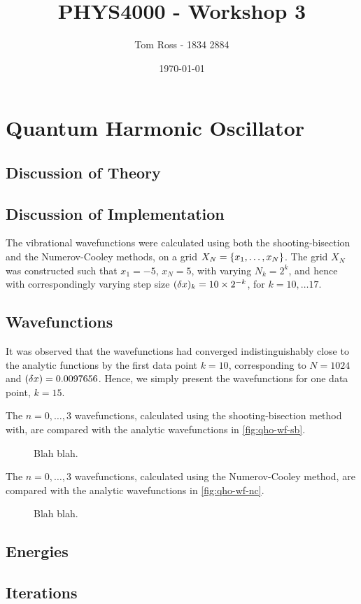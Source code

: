 \documentclass{article}
\title{PHYS4000 - Workshop 3}
\author{Tom Ross - 1834 2884}
\date{\today}
\begin{document}
\tableofcontents

\listoffigures

\listoftables

\clearpage

\section{Quantum Harmonic Oscillator}
\label{sec:qho}

\subsection*{Discussion of Theory}
\label{sec:qho-theory}

\subsection*{Discussion of Implementation}
\label{sec:qho-implementation}

The vibrational wavefunctions were calculated using both the shooting-bisection
and the Numerov-Cooley methods, on a grid
$X_{N} = \lbrace x_{1}, \dotsc, x_{N}\rbrace$.
The grid $X_{N}$ was constructed such that $x_{1} = -5$, $x_{N} = 5$, with
varying $N_{k} = 2^{k}$, and hence with correspondingly varying step size
$(\delta x)_{k} = 10 \times 2^{-k}$, for $k = 10, \dotsc 17$.

\subsection*{Wavefunctions}
\label{sec:qho-wavefunctions}

It was observed that the wavefunctions had converged indistinguishably close to
the analytic functions by the first data point $k = 10$, corresponding to
$N = 1024$ and $(\delta x) = 0.0097656$.
Hence, we simply present the wavefunctions for one data point, $k = 15$.

The $n = 0, \dotsc, 3$ wavefunctions, calculated using the shooting-bisection
method with, are compared with the analytic wavefunctions in
\autoref{fig:qho-wf-sb}.

\begin{figure}[h]
  \begin{center}
    
  \end{center}
  \caption[Bleh]{
    Blah blah.
  }
  \label{fig:qho-wf-sb}
\end{figure}

The $n = 0, \dotsc, 3$ wavefunctions, calculated using the Numerov-Cooley
method, are compared with the analytic wavefunctions in \autoref{fig:qho-wf-nc}.

\begin{figure}[h]
  \begin{center}
    
  \end{center}
  \caption[Bleh]{
    Blah blah.
  }
  \label{fig:qho-wf-nc}
\end{figure}

\subsection*{Energies}
\label{sec:qho-energies}

\subsection*{Iterations}
\label{sec:qho-iterations}
\end{document}
